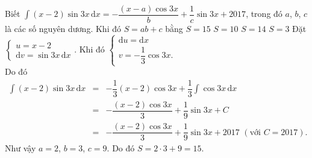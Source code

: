 \begin{ex}%
 Biết $\displaystyle\int (x-2)\sin3x\mathrm{\,d}x = -\dfrac{(x-a)\cos3x}{b}+\dfrac{1}{c}\sin3x+2017$, trong đó $a$, $b$, $c$ là các số nguyên dương. Khi đó $S = ab+c$ bằng
 \choice
  {\True $S=15$}
  {$S=10$}
  {$S=14$}
  {$S=3$}
 \loigiai
  {
  Đặt $\begin{cases} u=x-2 \\ \mathrm{d}v=\sin3x\mathrm{\,d}x \end{cases}$. Khi đó $\begin{cases} \mathrm{d}u=\mathrm{d}x \\ v=-\dfrac{1}{3}\cos3x. \end{cases}$\\
  Do đó
  \allowdisplaybreaks
  \begin{eqnarray*}
   \displaystyle\int (x-2)\sin3x\mathrm{\,d}x &=& -\dfrac{1}{3}(x-2)\cos3x + \dfrac{1}{3}\displaystyle\int \cos3x \mathrm{\,d}x \\
   &=& -\dfrac{(x-2)\cos3x}{3} + \dfrac{1}{9}\sin3x + C \\
   &=& -\dfrac{(x-2)\cos3x}{3} + \dfrac{1}{9}\sin3x + 2017 \,\,(\text{với } C=2017).
  \end{eqnarray*}
  Như vậy $a = 2$, $b = 3$, $c = 9$. Do đó $S = 2 \cdot 3 + 9 = 15$.
  }
\end{ex}


